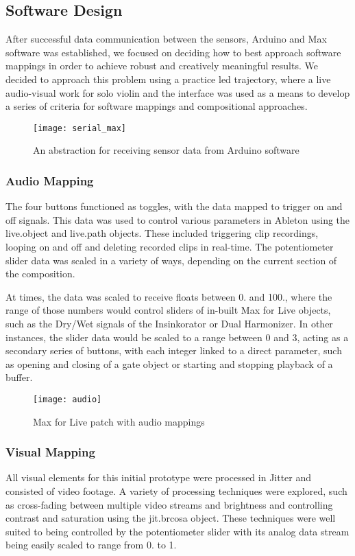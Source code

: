 \documentclass{nime-alternate}
\begin{document}
\subsection{Software Design}

After successful data communication between the sensors, Arduino and Max software was established, we focused on deciding how to best approach software mappings in order to achieve robust and creatively meaningful results. We decided to approach this problem using a practice led trajectory, where a live audio-visual work for solo violin and the interface was used as a means to develop a series of criteria for software mappings and compositional approaches\cite{candy:practice}. 

\begin{figure}[t]
	\centering
		\texttt{[image: serial\_max]}
	\caption{An abstraction for receiving sensor data from Arduino software}
	\label{fig:serial_max}
\end{figure}

\subsubsection{Audio Mapping}
The four buttons functioned as toggles, with the data mapped to trigger on and off signals. This data was used to control various parameters in Ableton using the live.object and live.path objects. These included triggering clip recordings, looping on and off and deleting recorded clips in real-time. The potentiometer slider data was scaled in a variety of ways, depending on the current section of the composition. 

At times, the data was scaled to receive floats between 0. and 100., where the range of those numbers would control sliders of in-built Max for Live objects, such as the Dry/Wet signals of the Insinkorator or Dual Harmonizer. In other instances, the slider data would be scaled to a range between 0 and 3, acting as a secondary series of buttons, with each integer linked to a direct parameter, such as opening and closing of a gate object or starting and stopping playback of a buffer. 

\begin{figure}[t]
	\centering
		\texttt{[image: audio]}
	\caption{Max for Live patch with audio mappings}
	\label{fig:audio}
\end{figure}

\subsubsection{Visual Mapping}
All visual elements for this initial prototype were processed in Jitter and consisted of video footage. A variety of processing techniques were explored, such as cross-fading between multiple video streams and brightness and controlling contrast and saturation using the jit.brcosa object. These techniques were well suited to being controlled by the potentiometer slider with its analog data stream being easily scaled to range from 0. to 1. 
\end{document}
